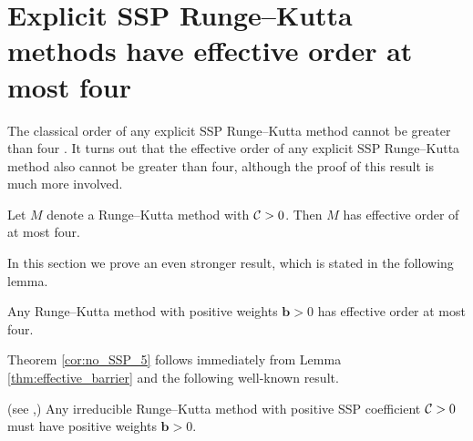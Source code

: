 \section{Explicit SSP Runge--Kutta methods have effective order at most four}\label{sec:ExRK_barrier}
The classical order of any explicit SSP Runge--Kutta method cannot be greater
than four \cite{Ruuth2002}.
It turns out that the effective order of any explicit SSP Runge--Kutta method 
also cannot be greater than four, although the proof of this result is much more
involved.  
\begin{theorem}\label{cor:no_SSP_5}
    Let $M$ denote a Runge--Kutta method with $\mathcal{C}>0$.
    Then $M$ has effective order of at most four.
\end{theorem}

In this section we prove an even stronger result,
which is stated in the following lemma.
\begin{lemma}\label{thm:effective_barrier}
	Any Runge--Kutta method with positive weights $\bm{b}>0$
        has effective order at most four.
\end{lemma}

Theorem \ref{cor:no_SSP_5} follows immediately from Lemma \ref{thm:effective_barrier}
and the following well-known result.
\begin{lemma}\label{lem:positive_b}(see \cite[Theorem~4.2]{Kraaijevanger1991},\cite[Lemma 4.2]{Ruuth2002})
	Any irreducible Runge--Kutta method with positive SSP coefficient $\mathcal{C}>0$
	must have positive weights $\bm{b}>0$.
\end{lemma}

